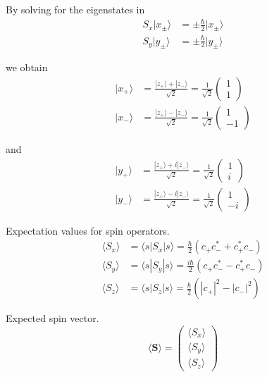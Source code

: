 By solving for the eigenstates in
\begin{align*}
S_x|x_\pm\rangle&=\pm\tfrac{\hbar}{2}|x_\pm\rangle
\\
S_y|y_\pm\rangle&=\pm\tfrac{\hbar}{2}|y_\pm\rangle
\end{align*}

we obtain
\begin{align*}
|x_+\rangle&=\frac{|z_+\rangle+|z_-\rangle}{\sqrt2}=\frac{1}{\sqrt2}\begin{pmatrix}1\\1\end{pmatrix}
\\
|x_-\rangle&=\frac{|z_+\rangle-|z_-\rangle}{\sqrt2}=\frac{1}{\sqrt2}\begin{pmatrix}1\\-1\end{pmatrix}
\end{align*}

and
\begin{align*}
|y_+\rangle&=\frac{|z_+\rangle+i|z_-\rangle}{\sqrt2}=\frac{1}{\sqrt2}\begin{pmatrix}1\\i\end{pmatrix}
\\
|y_-\rangle&=\frac{|z_+\rangle-i|z_-\rangle}{\sqrt2}=\frac{1}{\sqrt2}\begin{pmatrix}1\\-i\end{pmatrix}
\end{align*}

Expectation values for spin operators.
\begin{align*}
\langle S_x\rangle&=\langle s|S_x|s\rangle=\frac{\hbar}{2}\left(c_+c_-^*+c_+^*c_-\right)
\\
\langle S_y\rangle&=\langle s|S_y|s\rangle=\frac{i\hbar}{2}\left(c_+c_-^*-c_+^*c_-\right)
\\
\langle S_z\rangle&=\langle s|S_z|s\rangle=\frac{\hbar}{2}\left(|c_+|^2-|c_-|^2\right)
\end{align*}

Expected spin vector.
\begin{equation*}
\langle\mathbf S\rangle=\begin{pmatrix}
\langle S_x\rangle\\
\langle S_y\rangle\\
\langle S_z\rangle
\end{pmatrix}
\end{equation*}

